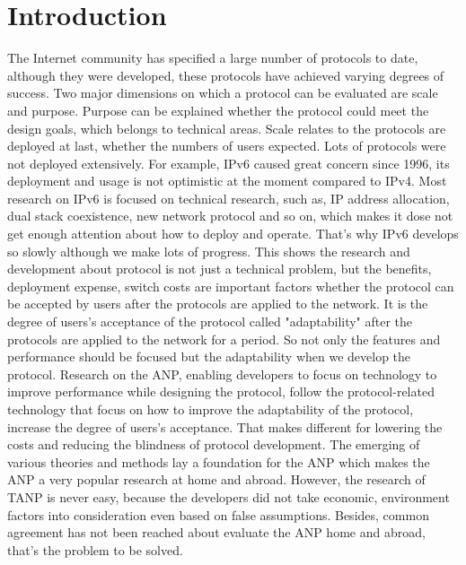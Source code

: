 \documentclass{article}
\begin{document}
\section{Introduction}
The Internet community has specified a large number of protocols to date, although they were developed, these 
protocols have achieved varying degrees of success. Two major dimensions on which a protocol can be evaluated 
are scale and purpose. Purpose can be explained whether the protocol could meet the design goals, which belongs 
to technical areas. Scale relates to the protocols are deployed at last, whether the numbers of users expected. 
Lots of protocols were not deployed  extensively. For example, IPv6 caused great concern since 1996, its deployment 
and usage is not optimistic at the moment compared to IPv4. Most research on IPv6 is focused on technical research, 
such as, IP address allocation, dual stack coexistence, new network protocol and so on, which makes it dose not 
get enough attention about how to deploy and operate. That's why IPv6 develops so slowly although we make lots of 
progress. This shows the research and development about protocol is not just a technical problem, but the benefits, 
deployment expense, switch costs are important factors whether the protocol can be accepted by users after the 
protocols are applied to the network. It is the degree of users's acceptance of the protocol called "adaptability" 
after the protocols are applied to the network for a period. So not only the features and performance should be 
focused but the adaptability when we develop the protocol. Research on the ANP, enabling developers to focus on 
technology to improve performance while designing the protocol, follow the protocol-related technology that 
focus on how to improve the adaptability of the protocol, increase the degree of users's acceptance. That makes 
different for lowering the costs and reducing the blindness of protocol development. The emerging of various 
theories and methods lay a foundation for the ANP which makes the ANP a very popular research at home and abroad. 
However, the research of TANP is never easy, because the developers did not take economic, environment factors into 
consideration even based on false assumptions. Besides, common agreement has not been reached about evaluate the ANP 
home and abroad, that's the problem to be solved.
\end{document}

